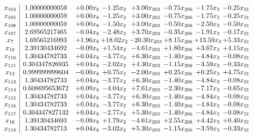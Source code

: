 \documentclass[8pt]{article}
\begin{document}
\[\begin{array}{c| c c@{\hskip 2pt} c@{\hskip 2pt} c@{\hskip 2pt} c@{\hskip 2pt} c@{\hskip 2pt} c@{\hskip 2pt} }
 x_{104}   &  1.00000000059 & +  0.00 x_{8} & -1.25 x_{2} & +  3.00 x_{203} & -0.75 x_{206} & -1.75 x_{3} & -0.25 x_{31}\\
 x_{105}   &  1.00000000059 & +  0.00 x_{8} & -1.25 x_{2} & +  3.00 x_{203} & -0.75 x_{206} & -1.75 x_{3} & -0.25 x_{31}\\
 x_{106}   &  1.00000000059 & +  0.00 x_{8} & -1.50 x_{2} & +  3.00 x_{203} & -0.50 x_{206} & -2.50 x_{3} & -0.50 x_{31}\\
 x_{107}   &  2.69565217465 & -0.04 x_{8} & -2.48 x_{2} & +  3.70 x_{203} & -0.35 x_{206} & -1.91 x_{3} & -0.17 x_{31}\\
 x_{7}   &  1.69565216993 & +  1.96 x_{8} & + 18.02 x_{2} & -20.30 x_{203} & +  8.15 x_{206} & + 13.59 x_{3} & +  5.33 x_{31}\\
 x_{18}   &  2.39130434692 & -0.09 x_{8} & +  1.54 x_{2} & -4.61 x_{203} & +  1.80 x_{206} & +  3.67 x_{3} & +  4.15 x_{31}\\
 x_{110}   &  1.30434782733 & +  0.04 x_{8} & -3.77 x_{2} & +  6.30 x_{203} & -1.40 x_{206} & -4.84 x_{3} & -0.08 x_{31}\\
 x_{111}   &  0.304347826935 & +  0.04 x_{8} & -2.02 x_{2} & +  4.30 x_{203} & -1.15 x_{206} & -3.59 x_{3} & -0.33 x_{31}\\
 x_{12}   &  0.999999999604 & -0.00 x_{8} & +  0.75 x_{2} & -2.00 x_{203} & +  0.25 x_{206} & +  0.25 x_{3} & +  4.75 x_{31}\\
 x_{113}   &  1.30434782733 & +  0.04 x_{8} & -3.77 x_{2} & +  6.30 x_{203} & -1.40 x_{206} & -4.84 x_{3} & -0.08 x_{31}\\
 x_{114}   &  0.608695653672 & +  0.09 x_{8} & -4.04 x_{2} & +  7.61 x_{203} & -2.30 x_{206} & -7.17 x_{3} & -0.65 x_{31}\\
 x_{115}   &  1.30434782733 & +  0.04 x_{8} & -3.77 x_{2} & +  6.30 x_{203} & -1.40 x_{206} & -4.84 x_{3} & -0.08 x_{31}\\
 x_{116}   &  1.30434782733 & +  0.04 x_{8} & -3.77 x_{2} & +  6.30 x_{203} & -1.40 x_{206} & -4.84 x_{3} & -0.08 x_{31}\\
 x_{117}   &  0.304347827132 & +  0.04 x_{8} & -2.77 x_{2} & +  5.30 x_{203} & -1.40 x_{206} & -4.84 x_{3} & -0.08 x_{31}\\
 x_{16}   &  1.39130434693 & -0.09 x_{8} & +  1.79 x_{2} & -4.61 x_{203} & +  2.55 x_{206} & +  4.42 x_{3} & +  0.40 x_{31}\\
 x_{119}   &  1.30434782713 & +  0.04 x_{8} & -3.02 x_{2} & +  5.30 x_{203} & -1.15 x_{206} & -3.59 x_{3} & -0.33 x_{31}\\

\end{array}\]
\end{document}
